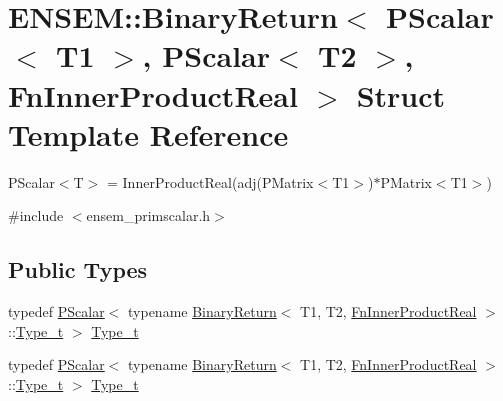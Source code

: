 \hypertarget{structENSEM_1_1BinaryReturn_3_01PScalar_3_01T1_01_4_00_01PScalar_3_01T2_01_4_00_01FnInnerProductReal_01_4}{}\section{E\+N\+S\+EM\+:\+:Binary\+Return$<$ P\+Scalar$<$ T1 $>$, P\+Scalar$<$ T2 $>$, Fn\+Inner\+Product\+Real $>$ Struct Template Reference}
\label{structENSEM_1_1BinaryReturn_3_01PScalar_3_01T1_01_4_00_01PScalar_3_01T2_01_4_00_01FnInnerProductReal_01_4}


P\+Scalar$<$\+T$>$ = Inner\+Product\+Real(adj(\+P\+Matrix$<$\+T1$>$)$\ast$\+P\+Matrix$<$\+T1$>$)  




{\ttfamily \#include $<$ensem\+\_\+primscalar.\+h$>$}

\subsection*{Public Types}
\begin{DoxyCompactItemize}
\item 
typedef \mbox{\hyperlink{classENSEM_1_1PScalar}{P\+Scalar}}$<$ typename \mbox{\hyperlink{structENSEM_1_1BinaryReturn}{Binary\+Return}}$<$ T1, T2, \mbox{\hyperlink{structENSEM_1_1FnInnerProductReal}{Fn\+Inner\+Product\+Real}} $>$\+::\mbox{\hyperlink{structENSEM_1_1BinaryReturn_3_01PScalar_3_01T1_01_4_00_01PScalar_3_01T2_01_4_00_01FnInnerProductReal_01_4_a20722f3bcaa8e004d4ff8dd5e7007fda}{Type\+\_\+t}} $>$ \mbox{\hyperlink{structENSEM_1_1BinaryReturn_3_01PScalar_3_01T1_01_4_00_01PScalar_3_01T2_01_4_00_01FnInnerProductReal_01_4_a20722f3bcaa8e004d4ff8dd5e7007fda}{Type\+\_\+t}}
\item 
typedef \mbox{\hyperlink{classENSEM_1_1PScalar}{P\+Scalar}}$<$ typename \mbox{\hyperlink{structENSEM_1_1BinaryReturn}{Binary\+Return}}$<$ T1, T2, \mbox{\hyperlink{structENSEM_1_1FnInnerProductReal}{Fn\+Inner\+Product\+Real}} $>$\+::\mbox{\hyperlink{structENSEM_1_1BinaryReturn_3_01PScalar_3_01T1_01_4_00_01PScalar_3_01T2_01_4_00_01FnInnerProductReal_01_4_a20722f3bcaa8e004d4ff8dd5e7007fda}{Type\+\_\+t}} $>$ \mbox{\hyperlink{structENSEM_1_1BinaryReturn_3_01PScalar_3_01T1_01_4_00_01PScalar_3_01T2_01_4_00_01FnInnerProductReal_01_4_a20722f3bcaa8e004d4ff8dd5e7007fda}{Type\+\_\+t}}
\end{DoxyCompactItemize}


